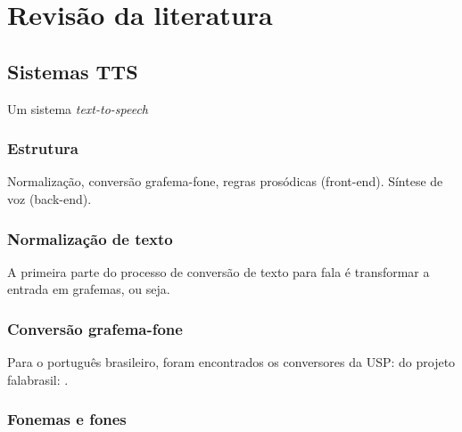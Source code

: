 

\chapter{Revisão da literatura}



\section{Sistemas TTS}
Um sistema \emph{text-to-speech}
\subsection{Estrutura}
Normalização, conversão grafema-fone, regras prosódicas (front-end).
Síntese de voz (back-end).
\subsection{Normalização de texto}
A primeira parte do processo de conversão de texto para fala é transformar a entrada em grafemas, ou seja.
\subsection{Conversão grafema-fone}
Para o português brasileiro, foram encontrados os conversores
da USP: \cite{g2pusp}
do projeto falabrasil: \cite{falabrasil}.
\subsection{Fonemas e fones}
